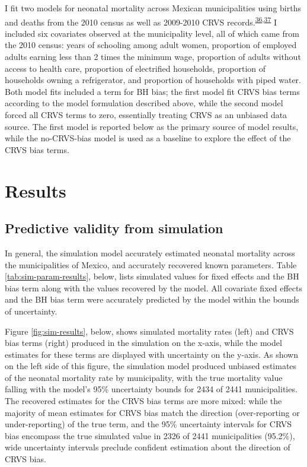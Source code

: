 \documentclass[
]{article}
\begin{document}
I fit two models for neonatal mortality across Mexican municipalities using births and deaths from the 2010 census as well as 2009-2010 CRVS records.\textsuperscript{\protect\hyperlink{ref-INEGI2010}{36},\protect\hyperlink{ref-INEGI2010a}{37}} I included six covariates observed at the municipality level, all of which came from the 2010 census: years of schooling among adult women, proportion of employed adults earning less than 2 times the minimum wage, proportion of adults without access to health care, proportion of electrified households, proportion of households owning a refrigerator, and proportion of households with piped water. Both model fits included a term for BH bias; the first model fit CRVS bias terms according to the model formulation described above, while the second model forced all CRVS terms to zero, essentially treating CRVS as an unbiased data source. The first model is reported below as the primary source of model results, while the no-CRVS-bias model is used as a baseline to explore the effect of the CRVS bias terms.

\hypertarget{results}{%
\section{Results}\label{results}}

\hypertarget{predictive-validity-from-simulation}{%
\subsection{Predictive validity from simulation}\label{predictive-validity-from-simulation}}

In general, the simulation model accurately estimated neonatal mortality across the municipalities of Mexico, and accurately recovered known parameters. Table \ref{tab:sim-param-results}, below, lists simulated values for fixed effects and the BH bias term along with the values recovered by the model. All covariate fixed effects and the BH bias term were accurately predicted by the model within the bounds of uncertainty.

Figure \ref{fig:sim-results}, below, shows simulated mortality rates (left) and CRVS bias terms (right) produced in the simulation on the x-axis, while the model estimates for these terms are displayed with uncertainty on the y-axis. As shown on the left side of this figure, the simulation model produced unbiased estimates of the neonatal mortality rate by municipality, with the true mortality value falling with the model's 95\% uncertainty bounds for 2434 of 2441 municipalities. The recovered estimates for the CRVS bias terms are more mixed: while the majority of mean estimates for CRVS bias match the direction (over-reporting or under-reporting) of the true term, and the 95\% uncertainty intervals for CRVS bias encompass the true simulated value in 2326 of 2441 municipalities (95.2\%), wide uncertainty intervals preclude confident estimation about the direction of CRVS bias.
\end{document}
